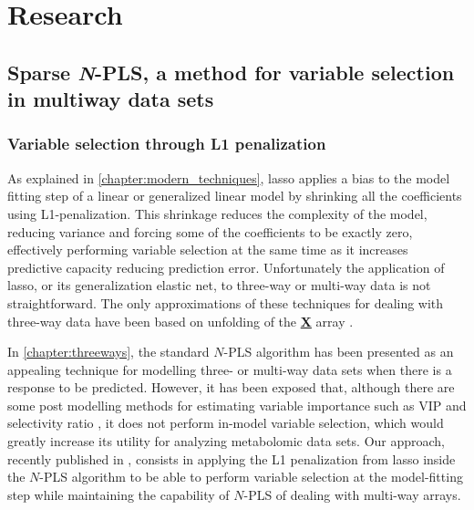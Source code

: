 \part{Research}
\chapter[Sparse \textit{N}-PLS, a method for variable selection in multiway data sets]{Sparse \textit{N}-PLS, a method for variable selection in multiway data sets}



\section{Variable selection through L1 penalization}
As explained in \autoref{chapter:modern_techniques}, lasso applies a bias to the model fitting step of a linear or generalized linear model by shrinking all the coefficients using L1-penalization. This shrinkage reduces the complexity of the model, reducing variance and forcing some of the coefficients to be exactly zero, effectively performing variable selection at the same time as it increases predictive capacity reducing prediction error. Unfortunately the application of lasso, or its generalization elastic net, to three-way or multi-way data is not straightforward. The only approximations of these techniques for dealing with three-way data have been based on unfolding of the \textbf{\underline{X}} array \parencite{chiu2013multiway}. 

In \autoref{chapter:threeways}, the standard $N$-PLS algorithm has been presented as an appealing technique for modelling three- or multi-way data sets when there is a response to be predicted. However, it has been exposed that, although there are some post modelling methods for estimating variable importance such as VIP \parencite{favilla2013assessing} and selectivity ratio \parencite{rajalahti2009biomarker},  it does not perform in-model variable selection, which would greatly increase its utility for analyzing metabolomic data sets. Our approach, recently published in \parencite{hervas2018sparse}, consists in applying the L1 penalization from lasso inside the $N$-PLS algorithm to be able to perform variable selection at the model-fitting step while maintaining the capability of $N$-PLS of dealing with multi-way arrays. 

